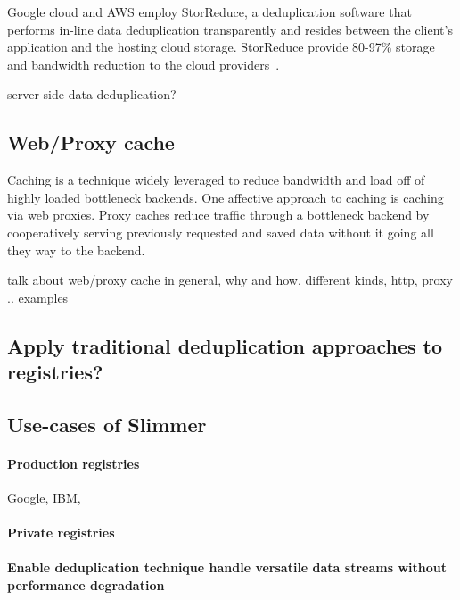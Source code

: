 Google cloud and AWS employ StorReduce, a deduplication software that performs in-line data deduplication transparently and resides between the client's application and the hosting cloud storage. StorReduce provide 80-97\% storage and bandwidth reduction to the cloud providers~\cite{StorReduce_google}.


server-side data deduplication?

\subsection{Web/Proxy cache}
Caching is a technique widely leveraged to reduce bandwidth and load off of highly loaded bottleneck backends. 
One affective approach to caching is caching via web proxies. Proxy caches reduce traffic through a bottleneck backend by 
cooperatively serving previously requested and saved data without it going all they way to the backend.

talk about web/proxy cache in general, why and how, different kinds, http, proxy .. examples


\subsection{Apply traditional deduplication approaches to registries?}



\subsection{Use-cases of Slimmer}

\paragraph{Production registries} Google, IBM,

\paragraph{Private registries}

\paragraph{Enable deduplication technique handle versatile data streams without performance degradation}

